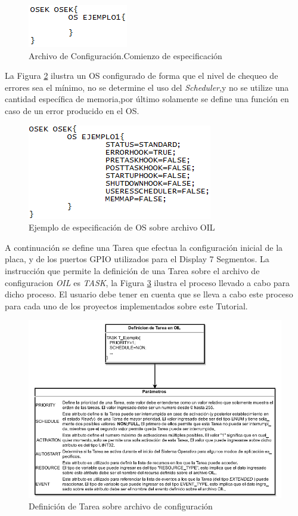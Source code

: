 \documentclass[12pt,letterpaper]{article}
\begin{document}
\begin{figure}[!h]
\centering
\includegraphics[width=5 cm]{figuras/f19.png}
\caption{Archivo de Configuración.Comienzo de especificación}
\label{Fig36}
\end{figure}

La Figura \ref{Fig37} ilustra un OS configurado de forma que el nivel de chequeo de errores sea el mínimo, no se determine el uso del \textit{Scheduler},y no se utilize una cantidad específica de memoria,por último solamente se define una función en caso de un error producido en el OS.

\begin{figure}[!h]
\centering
\includegraphics[width=5 cm]{figuras/f20.png}
\caption{Ejemplo de especificación de OS sobre archivo OIL}
\label{Fig37}
\end{figure}
A continuación se define una Tarea que efectua la configuración inicial de la placa, y de los puertos GPIO utilizados para el Display 7 Segmentos. La instrucción que permite la definición de una Tarea sobre el archivo de configuracion \textit{OIL} es \textit{TASK}, la Figura \ref{Fig38} ilustra el proceso llevado a cabo para dicho proceso. El usuario debe tener en cuenta que se lleva a cabo este proceso para cada uno de los proyectos implementados sobre este Tutorial.

\begin{figure}[!h]
\centering
\includegraphics[width=15 cm]{figuras/f21.png}
\caption{Definición de Tarea sobre archivo de configuración}
\label{Fig38}
\end{figure}
\end{document}
